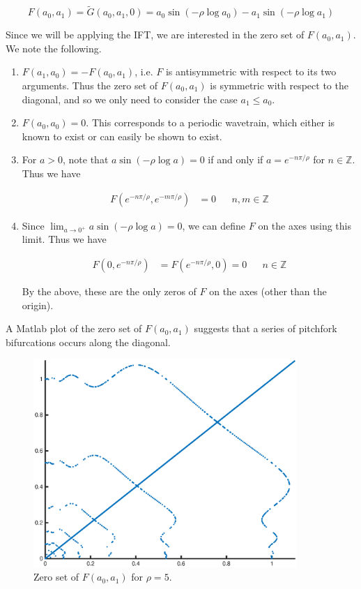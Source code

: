 \documentclass[12pt]{article}
\def\Z{{\mathbb Z}}
\begin{document}
\begin{equation}\label{defF}
F(a_0, a_1) = \tilde{G}(a_0, a_1, 0) = 
a_0 \sin \left( -\rho \log a_0 \right) - a_1 \sin \left( -\rho \log a_1 \right)
\end{equation}

Since we will be applying the IFT, we are interested in the zero set of $F(a_0, a_1)$. We note the following.

\begin{enumerate}
	\item $F(a_1, a_0) = -F(a_0, a_1)$, i.e. $F$ is antisymmetric with respect to its two arguments. Thus the zero set of $F(a_0, a_1)$ is symmetric with respect to the diagonal, and so we only need to consider the case $a_1 \leq a_0$.

	\item $F(a_0, a_0) = 0$. This corresponds to a periodic wavetrain, which either is known to exist or can easily be shown to exist.

	\item For $a > 0$, note that $a \sin \left( -\rho \log a \right) = 0$ if and only if $a = e^{-n \pi / \rho}$ for $n \in \Z$. Thus we have

	\begin{align*}
	F(e^{-n \pi / \rho}, e^{-m \pi / \rho}) &= 0 && n, m \in \Z
	\end{align*}

    \item Since $\lim_{a \rightarrow 0^+} a \sin \left( -\rho \log a \right) = 0$, we can define $F$ on the axes using this limit. Thus we have

    \begin{align*}
	F(0, e^{-n \pi / \rho}) &= F(e^{-n \pi / \rho}, 0) = 0 && n \in \Z
	\end{align*}

	By the above, these are the only zeros of $F$ on the axes (other than the origin).
\end{enumerate}

A Matlab plot of the zero set of $F(a_0, a_1)$ suggests that a series of pitchfork bifurcations occurs along the diagonal.

\begin{figure}[H]
\includegraphics[width=10cm]{zeroset5.eps}
\caption{Zero set of $F(a_0, a_1)$ for $\rho = 5$.}
\end{figure}
\end{document}
